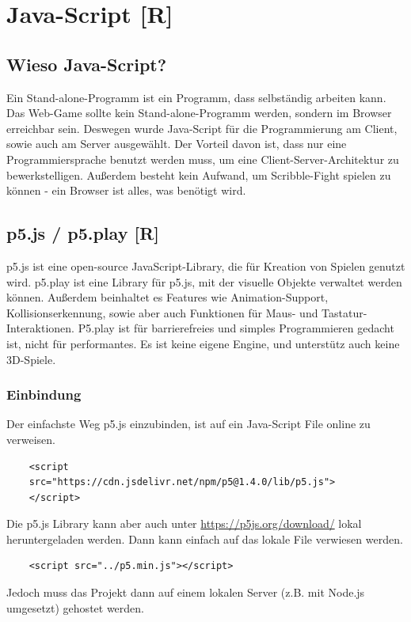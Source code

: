 
\section{Java-Script [R]}
\subsection{Wieso Java-Script?} 
Ein Stand-alone-Programm ist ein Programm, dass selbständig arbeiten kann.
Das Web-Game sollte kein Stand-alone-Programm werden, sondern im Browser erreichbar sein. Deswegen wurde Java-Script für die Programmierung am Client, sowie auch am Server ausgewählt.
Der Vorteil davon ist, dass nur eine Programmiersprache benutzt werden muss, um eine Client-Server-Architektur zu bewerkstelligen.
Außerdem besteht kein Aufwand, um Scribble-Fight spielen zu können - ein Browser ist alles, was benötigt wird.
\subsection{p5.js / p5.play [R]}
\label{subsection:p5js}\cite{p5js}
p5.js ist eine open-source JavaScript-Library, die für Kreation von Spielen genutzt wird.
p5.play ist eine Library für p5.js, mit der visuelle Objekte verwaltet werden können. Außerdem beinhaltet es Features wie Animation-Support,
Kollisionserkennung, sowie aber auch Funktionen für Maus- und Tastatur-Interaktionen.
P5.play ist für barrierefreies und simples Programmieren gedacht ist, nicht für performantes.
Es ist keine eigene Engine, und unterstütz auch keine 3D-Spiele.

\subsubsection{Einbindung}
Der einfachste Weg p5.js einzubinden, ist auf ein Java-Script File online zu verweisen.

\begin{lstlisting}
    <script 
    src="https://cdn.jsdelivr.net/npm/p5@1.4.0/lib/p5.js">
    </script>
\end{lstlisting}
Die p5.js Library kann aber auch
unter \url{https://p5js.org/download/} lokal heruntergeladen werden.
Dann kann einfach auf das lokale File verwiesen werden.

\begin{lstlisting}
    <script src="../p5.min.js"></script>
\end{lstlisting}

Jedoch muss das Projekt dann auf einem lokalen Server (z.B. mit Node.js umgesetzt) gehostet werden.

